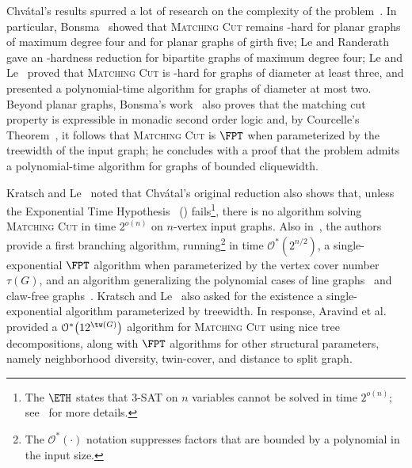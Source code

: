 \documentclass[a4paper,UKenglish,cleveref, autoref]{lipics-v2019}
\newcommand{\bigOs}[1]{\mathcal{O}^*\!\left(#1\right)}
\newcommand{\pname}[1]{\textsc{#1}}
\begin{document}
Chvátal's results spurred a lot of research on the complexity of the problem~\cite{matching_cut_ipec,matching_cut_structural,matching_cut_tcs, matching_cut_diameter, matching_cut_planar, matching_cut_series_parallel, stable_cutset_line_graphs}.
In particular, Bonsma~\cite{matching_cut_planar} showed that \pname{Matching Cut} remains \NP-hard for planar graphs of maximum degree four and for planar graphs of girth five;
Le and Randerath~\cite{stable_cutset_line_graphs} gave an \NP-hardness reduction for bipartite graphs of maximum degree four;
Le and Le~\cite{matching_cut_diameter} proved that \pname{Matching Cut} is \NP-hard for graphs of diameter at least three, and presented a polynomial-time algorithm for graphs of diameter at most two.
Beyond planar graphs, Bonsma's work~\cite{matching_cut_planar} also proves that the matching cut property is expressible in monadic second order logic and, by Courcelle's Theorem~\cite{courcelle_theorem}, it follows that \pname{Matching Cut} is $\FPT$ when parameterized by the treewidth of the input graph; he concludes with a proof that the problem admits a polynomial-time algorithm for graphs of bounded cliquewidth.

Kratsch and Le~\cite{matching_cut_tcs} noted that Chv\'atal's original reduction also shows that, unless the Exponential Time Hypothesis~\cite{eth} (\ETH) fails\footnote{The $\ETH$ states that 3-\textsc{SAT} on $n$ variables cannot be solved in time $2^{o(n)}$; see~\cite{eth} for more details.}, there is no algorithm solving \pname{Matching Cut} in time $2^{o(n)}$ on $n$-vertex input graphs.
Also in~\cite{matching_cut_tcs}, the authors provide a first branching algorithm, running\footnote{The $\bigOs{\cdot}$ notation suppresses factors that are bounded by a polynomial in the input size.} in time $\bigOs{2^{n/2}}$, a single-exponential $\FPT$ algorithm when parameterized by the vertex cover number $\tau(G)$, and an algorithm generalizing the polynomial cases of line graphs~\cite{matching_cut_moshi} and claw-free graphs~\cite{matching_cut_planar}.
Kratsch and Le~\cite{matching_cut_tcs} also asked for the existence a single-exponential algorithm parameterized by treewidth.
In response, Aravind et al.~\cite{matching_cut_structural} provided a $\bigOs{12^{\tw(G)}}$ algorithm for \pname{Matching Cut} using nice tree decompositions, along with $\FPT$ algorithms for other structural parameters, namely neighborhood diversity, twin-cover, and distance to split graph.
\end{document}

